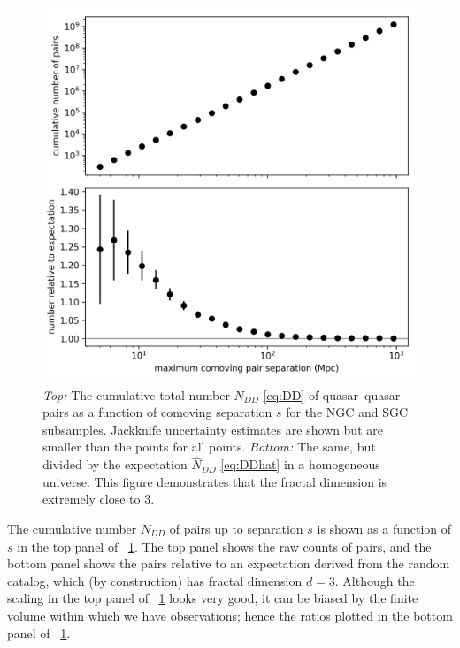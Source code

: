 \documentclass[modern]{aastex631}
\newlength{\figurewidth}
\newcommand{\figref}[1]{\figurename~\ref{#1}}
\begin{document}
\begin{figure}[t!]
  \begin{mdframed}
  \color{captiongray}
  \begin{center}
    \includegraphics[width=\figurewidth]{notebooks/cumulativeDD_DR.png}
  \end{center}
    \caption{\textsl{Top:} The cumulative total number $N_{DD}$ \eqref{eq:DD} of quasar--quasar pairs as a function of comoving separation $s$ for the NGC and SGC subsamples. Jackknife uncertainty estimates are shown but are smaller than the points for all points.
    \textsl{Bottom:} The same, but divided by the expectation $\hat{N}_{DD}$ \eqref{eq:DDhat} in a homogeneous universe.
    This figure demonstrates that the fractal dimension is extremely close to $3$.\label{fig:cumulative}}
  \end{mdframed}
\end{figure}
The cumulative number $N_{DD}$ of pairs up to separation $s$ is shown as a function of $s$ in the top panel of \figref{fig:cumulative}.
The top panel shows the raw counts of pairs, and the bottom panel shows the pairs relative to an expectation derived from the random catalog, which (by construction) has fractal dimension $d=3$.
Although the scaling in the top panel of \figref{fig:cumulative} looks very good, it can be biased by the finite volume within which we have observations; hence the ratios plotted in the bottom panel of \figref{fig:cumulative}.
\end{document}
